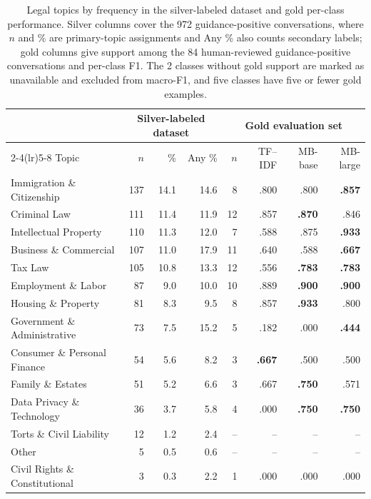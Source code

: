 \begin{table}[H]
\centering
\scriptsize
\setlength{\tabcolsep}{4pt}
\begin{tabular}{lrrrrrrr}
\toprule
& \multicolumn{3}{c}{Silver-labeled dataset} & \multicolumn{4}{c}{Gold evaluation set} \\
\cmidrule(lr){2-4}\cmidrule(lr){5-8}
Topic & $n$ & \% & Any \% & $n$ & TF--IDF & MB-base & MB-large \\
\midrule
Immigration \& Citizenship & 137 & 14.1 & 14.6 & 8 & .800 & .800 & \textbf{.857} \\
Criminal Law & 111 & 11.4 & 11.9 & 12 & .857 & \textbf{.870} & .846 \\
Intellectual Property & 110 & 11.3 & 12.0 & 7 & .588 & .875 & \textbf{.933} \\
Business \& Commercial & 107 & 11.0 & 17.9 & 11 & .640 & .588 & \textbf{.667} \\
Tax Law & 105 & 10.8 & 13.3 & 12 & .556 & \textbf{.783} & \textbf{.783} \\
Employment \& Labor & 87 & 9.0 & 10.0 & 10 & .889 & \textbf{.900} & \textbf{.900} \\
Housing \& Property & 81 & 8.3 & 9.5 & 8 & .857 & \textbf{.933} & .800 \\
Government \& Administrative & 73 & 7.5 & 15.2 & 5 & .182 & .000 & \textbf{.444} \\
Consumer \& Personal Finance & 54 & 5.6 & 8.2 & 3 & \textbf{.667} & .500 & .500 \\
Family \& Estates & 51 & 5.2 & 6.6 & 3 & .667 & \textbf{.750} & .571 \\
Data Privacy \& Technology & 36 & 3.7 & 5.8 & 4 & .000 & \textbf{.750} & \textbf{.750} \\
Torts \& Civil Liability & 12 & 1.2 & 2.4 & -- & -- & -- & -- \\
Other & 5 & 0.5 & 0.6 & -- & -- & -- & -- \\
Civil Rights \& Constitutional & 3 & 0.3 & 2.2 & 1 & .000 & .000 & .000 \\
\bottomrule
\end{tabular}
\caption{Legal topics by frequency in the silver-labeled dataset and gold per-class performance. Silver columns cover the 972 guidance-positive conversations, where $n$ and \% are primary-topic assignments and Any \% also counts secondary labels; gold columns give support among the 84 human-reviewed guidance-positive conversations and per-class F1. The 2 classes without gold support are marked as unavailable and excluded from macro-F1, and five classes have five or fewer gold examples.}
\label{tab:topic-full}
\end{table}
